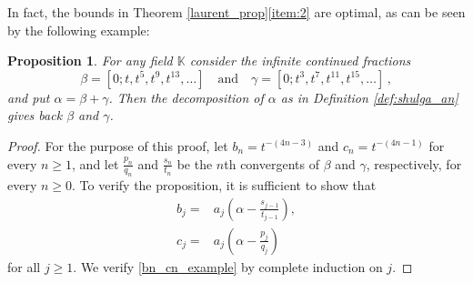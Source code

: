 \documentclass[a4paper,12pt]{article}
\newtheorem{prop}[thm]{Proposition}
\def\fq{\bbk}
\def\fttt{\fq\!\left(\!\left(t^{-1}\right)\!\right)}
\def\bbk{\mathbb{K}}
\begin{document}
In fact, the bounds in Theorem \ref{laurent_prop}\eqref{item:2} are optimal, as can be seen by the following example:

\begin{prop}
For any field $\fq$ consider the infinite continued fractions
\begin{equation}
\label{beta_gamma_def}
\beta=[0;t,t^5,t^9,t^{13},\ldots]\quad\text{and}\quad
\gamma=[0;t^3,t^7,t^{11},t^{15},\ldots]\,,
\end{equation}
and put $\alpha=\beta+\gamma$. Then the decomposition of $\alpha$ as in Definition \ref{def:shulga_an} gives back $\beta$ and $\gamma$.    
\end{prop}
\begin{proof}
For the purpose of this proof, let $b_n=t^{-(4n-3)}$ and $c_n=t^{-(4n-1)}$ for every $n\geq1$, and let $\frac{p_n}{q_n}$ and $\frac{s_n}{t_n}$ be the $n$th convergents of $\beta$ and $\gamma$, respectively, for every $n\geq0$. %
 To verify the proposition, it is sufficient to show that
\begin{equation}
\begin{split}
\label{bn_cn_example}
b_j=&a_j\left(\alpha-\frac{s_{j-1}}{t_{j-1}}\right),\\
c_j=&a_j\left(\alpha-\frac{p_{j}}{q_{j}}\right)
\end{split}
\end{equation}
for all $j\ge 1$.
We verify \eqref{bn_cn_example} by complete induction on $j$. 

\end{proof}
\end{document}
